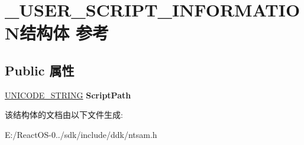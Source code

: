 \hypertarget{struct___u_s_e_r___s_c_r_i_p_t___i_n_f_o_r_m_a_t_i_o_n}{}\section{\+\_\+\+U\+S\+E\+R\+\_\+\+S\+C\+R\+I\+P\+T\+\_\+\+I\+N\+F\+O\+R\+M\+A\+T\+I\+O\+N结构体 参考}
\label{struct___u_s_e_r___s_c_r_i_p_t___i_n_f_o_r_m_a_t_i_o_n}
\subsection*{Public 属性}
\begin{DoxyCompactItemize}
\item 
\mbox{\label{struct___u_s_e_r___s_c_r_i_p_t___i_n_f_o_r_m_a_t_i_o_n_a54be477486cdc25323964e9003ea1b2c}} 
\hyperlink{struct___u_n_i_c_o_d_e___s_t_r_i_n_g}{U\+N\+I\+C\+O\+D\+E\+\_\+\+S\+T\+R\+I\+NG} {\bfseries Script\+Path}
\end{DoxyCompactItemize}


该结构体的文档由以下文件生成\+:\begin{DoxyCompactItemize}
\item 
E\+:/\+React\+O\+S-\/0../sdk/include/ddk/ntsam.\+h\end{DoxyCompactItemize}
